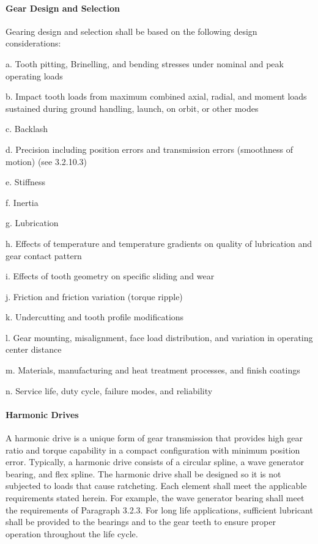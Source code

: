 \documentclass[12pt]{article}
\begin{document}
\paragraph{Gear Design and Selection} %
Gearing design and selection shall be based on the following design considerations:

a. Tooth pitting, Brinelling, and bending stresses under nominal and peak operating loads

b. Impact tooth loads from maximum combined axial, radial, and moment loads sustained during ground handling, launch, on orbit, or other modes

c. Backlash

d. Precision including position errors and transmission errors (smoothness of motion) (see 3.2.10.3)

e. Stiffness

f. Inertia

g. Lubrication

h. Effects of temperature and temperature gradients on quality of lubrication and gear contact pattern

i. Effects of tooth geometry on specific sliding and wear

j. Friction and friction variation (torque ripple)

k. Undercutting and tooth profile modifications

l. Gear mounting, misalignment, face load distribution, and variation in operating center distance

m. Materials, manufacturing and heat treatment processes, and finish coatings

n. Service life, duty cycle, failure modes, and reliability

\paragraph{Harmonic Drives} %
A harmonic drive is a unique form of gear transmission that provides high gear ratio and torque capability in a compact configuration with minimum position error. 
Typically, a harmonic drive consists of a circular spline, a wave generator bearing, and flex spline. 
The harmonic drive shall be designed so it is not subjected to loads that cause ratcheting. 
Each element shall meet the applicable requirements stated herein. 
For example, the wave generator bearing shall meet the requirements of Paragraph 3.2.3. 
For long life applications, sufficient lubricant shall be provided to the bearings and to the gear teeth to ensure proper operation throughout the life cycle.
\end{document}
